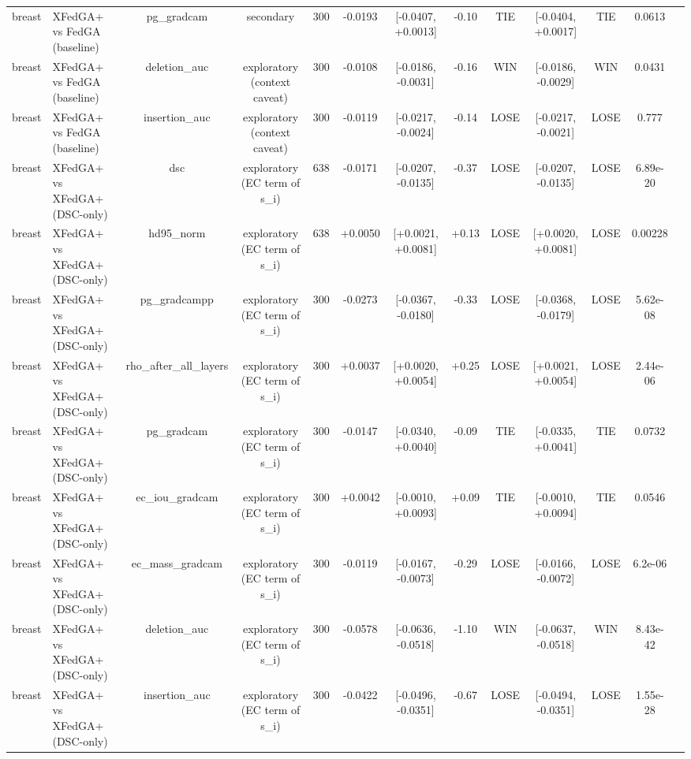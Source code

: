 \begin{tabular}{llccccccccccc}
breast & XFedGA+ vs FedGA (baseline) & pg\_gradcam & secondary & 300 & -0.0193 & [-0.0407, +0.0013] & -0.10 & TIE & [-0.0404, +0.0017] & TIE & 0.0613 &  \\
breast & XFedGA+ vs FedGA (baseline) & deletion\_auc & exploratory (context caveat) & 300 & -0.0108 & [-0.0186, -0.0031] & -0.16 & WIN & [-0.0186, -0.0029] & WIN & 0.0431 &  \\
breast & XFedGA+ vs FedGA (baseline) & insertion\_auc & exploratory (context caveat) & 300 & -0.0119 & [-0.0217, -0.0024] & -0.14 & LOSE & [-0.0217, -0.0021] & LOSE & 0.777 &  \\
breast & XFedGA+ vs XFedGA+ (DSC-only) & dsc & exploratory (EC term of s\_i) & 638 & -0.0171 & [-0.0207, -0.0135] & -0.37 & LOSE & [-0.0207, -0.0135] & LOSE & 6.89e-20 &  \\
breast & XFedGA+ vs XFedGA+ (DSC-only) & hd95\_norm & exploratory (EC term of s\_i) & 638 & +0.0050 & [+0.0021, +0.0081] & +0.13 & LOSE & [+0.0020, +0.0081] & LOSE & 0.00228 &  \\
breast & XFedGA+ vs XFedGA+ (DSC-only) & pg\_gradcampp & exploratory (EC term of s\_i) & 300 & -0.0273 & [-0.0367, -0.0180] & -0.33 & LOSE & [-0.0368, -0.0179] & LOSE & 5.62e-08 &  \\
breast & XFedGA+ vs XFedGA+ (DSC-only) & rho\_after\_all\_layers & exploratory (EC term of s\_i) & 300 & +0.0037 & [+0.0020, +0.0054] & +0.25 & LOSE & [+0.0021, +0.0054] & LOSE & 2.44e-06 &  \\
breast & XFedGA+ vs XFedGA+ (DSC-only) & pg\_gradcam & exploratory (EC term of s\_i) & 300 & -0.0147 & [-0.0340, +0.0040] & -0.09 & TIE & [-0.0335, +0.0041] & TIE & 0.0732 &  \\
breast & XFedGA+ vs XFedGA+ (DSC-only) & ec\_iou\_gradcam & exploratory (EC term of s\_i) & 300 & +0.0042 & [-0.0010, +0.0093] & +0.09 & TIE & [-0.0010, +0.0094] & TIE & 0.0546 &  \\
breast & XFedGA+ vs XFedGA+ (DSC-only) & ec\_mass\_gradcam & exploratory (EC term of s\_i) & 300 & -0.0119 & [-0.0167, -0.0073] & -0.29 & LOSE & [-0.0166, -0.0072] & LOSE & 6.2e-06 &  \\
breast & XFedGA+ vs XFedGA+ (DSC-only) & deletion\_auc & exploratory (EC term of s\_i) & 300 & -0.0578 & [-0.0636, -0.0518] & -1.10 & WIN & [-0.0637, -0.0518] & WIN & 8.43e-42 &  \\
breast & XFedGA+ vs XFedGA+ (DSC-only) & insertion\_auc & exploratory (EC term of s\_i) & 300 & -0.0422 & [-0.0496, -0.0351] & -0.67 & LOSE & [-0.0494, -0.0351] & LOSE & 1.55e-28 &  \\

\end{tabular}
